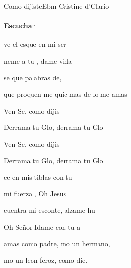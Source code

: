 \documentclass[12pt, spanish]{book}
\newcommand{\NotCCLIed}{\relax}
\begin{document}
    \begin{song}{Como dijiste}{Ebm}
    {} %
    {Cristine d'Clario}
    {} %
    {} %
        \ifChordBk
        \paragraph{\mbox{}\hfill\protect\href{https://open.spotify.com/intl-es/track/7BY5JRklkQUu4e0tlZDBy7}{Escuchar}\mbox{}\hfill}
        \fi


        \begin{SBOpGroup}
            ve el esque en mi ser~

            neme a tu , dame vida~

             se que palabras de,

            que proquen  me quie mas de lo  me amas
        \end{SBOpGroup}

        \begin{SBChorus}
            Ven Se, como dijis

            Derrama tu Glo, derrama tu Glo

            Ven Se, como dijis

            Derrama tu Glo, derrama tu Glo
        \end{SBChorus}

        \begin{SBOpGroup}
            ce en mis tiblas con tu 

             mi fuerza , Oh Jesus~

            cuentra mi esconte, alzame  hu

            Oh Señor Idame con tu a
        \end{SBOpGroup}
        \vskip 20pt
        \begin{SBOpGroup}
             amas como padre, mo un hermano,

            mo un leon feroz, como die.


\end{SBOpGroup}
\end{song}
\end{document}
